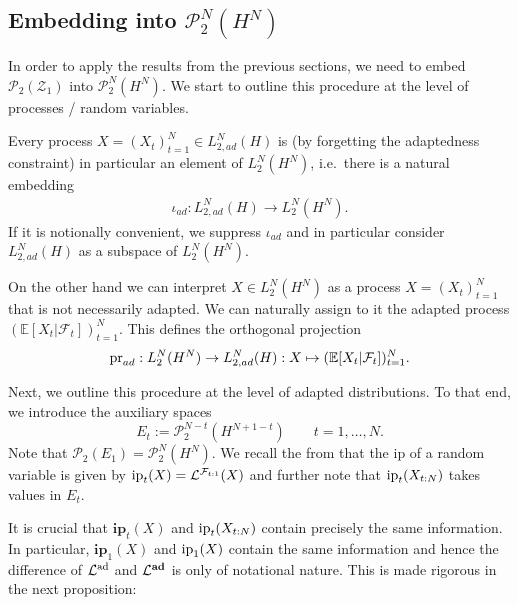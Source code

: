 \documentclass[a4paper]{amsart}
\numberwithin{theorem}{section}
\theoremstyle{definition}
\newcommand{\E}{\mathbb{E}}
\newcommand{\F}{\mathcal{F}}
\newcommand{\pr}{\textup{pr}}
\newcommand{\law}{\mathcal{L}}
\newcommand{\Pc}{\mathcal P}
\renewcommand{\H}{H}
\newcommand{\ip}{\textup{ip}}
\newcommand{\lawad}{\law^{\textup{ad}}}
\newcommand{\Zc}{\mathcal{Z}}
\newcommand{\ipp}{\mathbf{ip}}
\newcommand{\lawadd}{\law^{\textnormal{\textbf{ad}}}}
\begin{document}
\subsection{Embedding into $\Pc_2^N(\H^N)$}\label{sec:embed}
In order to apply the results from the previous sections, we need to embed $\Pc_2(\Zc_1)$ into $\Pc^N_2(\H^N)$. We start to outline this procedure at the level of processes / random variables.  

Every process $X = (X_t)_{t=1}^N \in L_{2,ad}^N(\H)$ is (by forgetting the adaptedness constraint) in particular an element of $L_2^N(\H^N)$, i.e.\ there is a natural embedding 
\begin{align}
    \iota_{ad} : L_{2,ad}^N(\H) \to L_2^N(\H^N).
\end{align}
If it is notionally convenient, we suppress $\iota_{ad} $ and in particular consider $L_{2,ad}^N(\H)$ as a subspace of $L_2^N(\H^N)$.

On the other hand we can interpret $X \in L_2^N(  \H^N)$ as a process $X = (X_t)_{t=1}^N$ that is not necessarily adapted. We can naturally assign to it the adapted process $(\E[X_t|\F_t])_{t=1}^N$. This defines the orthogonal projection
\begin{align}
    \pr_{ad} : L_2^N(  \H^N) \to L_{2,ad}^N(\H) : X \mapsto (\E[X_t|\F_t])_{t=1}^N.
\end{align}

\medskip

Next, we outline this procedure at the level of adapted distributions.  
To that end, we introduce the auxiliary spaces 
\[
E_t := \Pc_2^{N-t}(\H^{N+1-t}) \qquad t=1,\dots,N.
\]
Note that $\Pc_2(E_1) = \Pc_2^N(\H^N)$. We recall the from  that the ip of a random variable is given by $\ip_t(X) = \law^{\F_{t:1}}(X)$ and further note that $\ip_t(X_{t:N})$ takes values in $E_t$. 

It is crucial that $\ipp_t(X)$ and $\ip_t(X_{t:N})$ contain precisely the same information. In particular, $\ipp_1(X)$ and $\ip_1(X)$ contain the same information and hence the difference of $\lawad$ and $\lawadd$ is only of notational nature. This is made rigorous in the next proposition:
\end{document}
